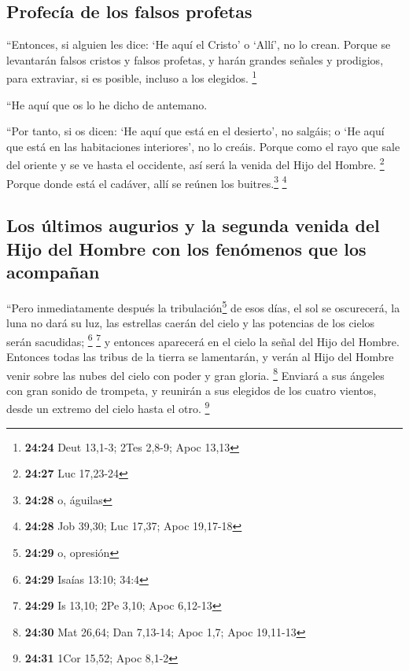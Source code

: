 \begin{paracol}{2}
\hypertarget{profecuxeda-de-los-falsos-profetas}{%
\subsection{Profecía de los falsos
profetas}\label{profecuxeda-de-los-falsos-profetas}}

 ``Entonces, si alguien les dice: `He aquí el Cristo' o
`Allí', no lo crean.  Porque se levantarán falsos cristos
y falsos profetas, y harán grandes señales y prodigios, para extraviar,
si es posible, incluso a los elegidos. \footnote{\textbf{24:24} Deut
  13,1-3; 2Tes 2,8-9; Apoc 13,13}

 ``He aquí que os lo he dicho de antemano.

 ``Por tanto, si os dicen: `He aquí que está en el
desierto', no salgáis; o `He aquí que está en las habitaciones
interiores', no lo creáis.  Porque como el rayo que sale
del oriente y se ve hasta el occidente, así será la venida del Hijo del
Hombre. \footnote{\textbf{24:27} Luc 17,23-24}  Porque
donde está el cadáver, allí se reúnen los buitres.\footnote{\textbf{24:28}
  o, águilas} \footnote{\textbf{24:28} Job 39,30; Luc 17,37; Apoc
  19,17-18}

\hypertarget{los-uxfaltimos-augurios-y-la-segunda-venida-del-hijo-del-hombre-con-los-fenuxf3menos-que-los-acompauxf1an}{%
\subsection{Los últimos augurios y la segunda venida del Hijo del Hombre
con los fenómenos que los
acompañan}\label{los-uxfaltimos-augurios-y-la-segunda-venida-del-hijo-del-hombre-con-los-fenuxf3menos-que-los-acompauxf1an}}

 ``Pero inmediatamente después la tribulación\footnote{\textbf{24:29}
  o, opresión} de esos días, el sol se oscurecerá, la luna no dará su
luz, las estrellas caerán del cielo y las potencias de los cielos serán
sacudidas; \footnote{\textbf{24:29} Isaías 13:10; 34:4} \footnote{\textbf{24:29}
  Is 13,10; 2Pe 3,10; Apoc 6,12-13}  y entonces aparecerá
en el cielo la señal del Hijo del Hombre. Entonces todas las tribus de
la tierra se lamentarán, y verán al Hijo del Hombre venir sobre las
nubes del cielo con poder y gran gloria. \footnote{\textbf{24:30} Mat
  26,64; Dan 7,13-14; Apoc 1,7; Apoc 19,11-13}  Enviará a
sus ángeles con gran sonido de trompeta, y reunirán a sus elegidos de
los cuatro vientos, desde un extremo del cielo hasta el otro.
\footnote{\textbf{24:31} 1Cor 15,52; Apoc 8,1-2}


\end{paracol}
